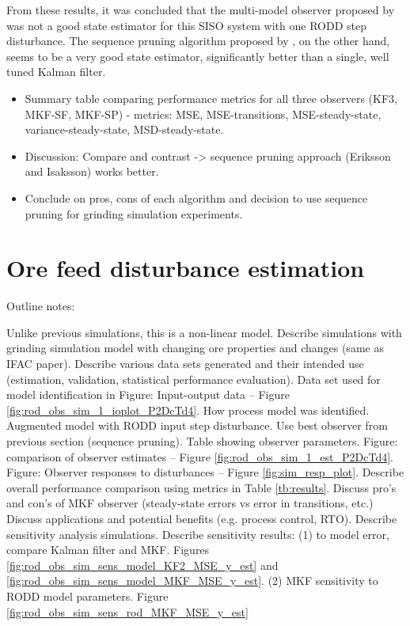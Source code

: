 From these results, it was concluded that the multi-model observer proposed by \cite{robertson_method_1998} was not a good state estimator for this SISO system with one \gls{RODD} step disturbance. The sequence pruning algorithm proposed by \cite{eriksson_classification_1996}, on the other hand, seems to be a very good state estimator, significantly better than a single, well tuned Kalman filter.

\begin{itemize}
	\item Summary table comparing performance metrics for all three observers (KF3, MKF-SF, MKF-SP) - metrics: MSE, MSE-transitions, MSE-steady-state, variance-steady-state, MSD-steady-state.
	\item Discussion: Compare and contrast -> sequence pruning approach (Eriksson and Isaksson) works better.
	\item Conclude on pros, cons of each algorithm and decision to use sequence pruning for grinding simulation experiments.
\end{itemize}

\section{Ore feed disturbance estimation} \label{section:sim-ore-SISO}

Outline notes:
\begin{outline}
	\1 Unlike previous simulations, this is a non-linear model.
	\1 Describe simulations with grinding simulation model with changing ore properties and changes (same as IFAC paper).
	\1 Describe various data sets generated and their intended use (estimation, validation, statistical performance evaluation).
	\1 Data set used for model identification in Figure: Input-output data – Figure \ref{fig:rod_obs_sim_1_ioplot_P2DcTd4}.
	\1 How process model was identified.
	\1 Augmented model with \gls{RODD} input step disturbance.
	\1 Use best observer from previous section (sequence pruning).
	\1 Table showing observer parameters.
	\1 Figure: comparison of observer estimates – Figure \ref{fig:rod_obs_sim_1_est_P2DcTd4}.
	\1 Figure: Observer responses to disturbances – Figure \ref{fig:sim_resp_plot}.
	\1 Describe overall performance comparison using metrics in Table \ref{tb:results}.
	\1 Discuss pro's and con's of MKF observer (steady-state errors vs error in transitions, etc.)
	\1 Discuss applications and potential benefits (e.g. process control, RTO).
	\1 Describe sensitivity analysis simulations.
	\1 Describe sensitivity results:
	\2 (1) to model error, compare Kalman filter and MKF. Figures \ref{fig:rod_obs_sim_sens_model_KF2_MSE_y_est} and \ref{fig:rod_obs_sim_sens_model_MKF_MSE_y_est}.
	\2 (2) MKF sensitivity to \gls{RODD} model parameters. Figure  \ref{fig:rod_obs_sim_sens_rod_MKF_MSE_y_est}
\end{outline}

